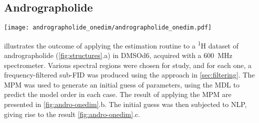 \subsection{Andrographolide}
\label{subsec:andro}
\begin{sidewaysfigure}
    \centering
    \texttt{[image: andrographolide\_onedim/andrographolide\_onedim.pdf]}
    \caption[
        Result of applying the estimation routine to selected regions of a
        pulse-acquire dataset of andrographolide.
    ]{
        Result of applying the estimation routine to selected regions of a
        pulse-acquire dataset of andrographolide in \acs{DMSOd6}.
        \textbf{a.} Spectral regions considered.
        \textbf{b.} The result of applying the \acs{MPM} to the regions, with
        the model order predicted using the \acs{MDL}. Blue and red lines denote
        individual oscillator peaks, while the grey line above is the sum of all
        oscillators. They grey line below is the residual between the data and
        the model.
        \textbf{c.} The result after convergence of the \acs{NLP} routine, again
        with the model above and residual below.
        Red peaks in b correspond to oscillators which acquire negative
        amplitudes and are removed during the \acs{NLP} routine.
        One of the estimated regions has been split in two in the
        figure to save space, with one half, featuring a signal from ethanol,
        being magnified.
    }
    \label{fig:andro-onedim}
\end{sidewaysfigure}
 illustrates the outcome of applying the
estimation routine to a \textsuperscript{1}H dataset of
andrographolide (\cref{fig:structures}.a) in \acs{DMSOd6}, acquired with
a \qty{600}{\mega\hertz} spectrometer.
Various spectral regions were chosen for study, and for each one, a
frequency-filtered sub-\ac{FID} was produced using the approach in
\cref{sec:filtering}.
The \ac{MPM} was used to generate an initial guess of parameters, using the
\ac{MDL} to predict the model order in each case. The result of applying the
\ac{MPM} are presented in \cref{fig:andro-onedim}.b. The initial guess
was then subjected to \ac{NLP}, giving rise to the result
\cref{fig:andro-onedim}.c.

